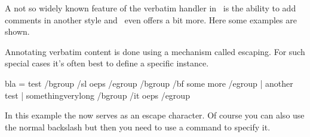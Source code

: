 
%


\startbuffer[abstract]
    A not so widely known feature of the verbatim handler in \CONTEXT\ is the
    ability to add comments in another style and \MKIV\ even offers a bit more.
    Here some examples are shown.
\stopbuffer

\startdocument
  [title={Annotated Verbatim},
   author=Hans Hagen,
   affiliation=PRAGMA ADE,
   date=July 2011,
   number=1102 \MKIV]


Annotating verbatim content is done using a mechanism called escaping. For such
special cases it's often best to define a specific instance.

\startbuffer[define]
\stopbuffer

\startbuffer[example]
\startannotatedtyping
bla = test               /bgroup /sl oeps /egroup
                         /bgroup /bf some more /egroup
    | another test
    | somethingverylong  /bgroup /it oeps /egroup
\stopannotatedtyping
\stopbuffer

 \getbuffer[define]

\starttextbackground[example]
    \getbuffer[example]
\stoptextbackground

In this example the \type {/} now serves as an escape character. Of course you
can also use the normal backslash but then you need to use a command to specify
it.

